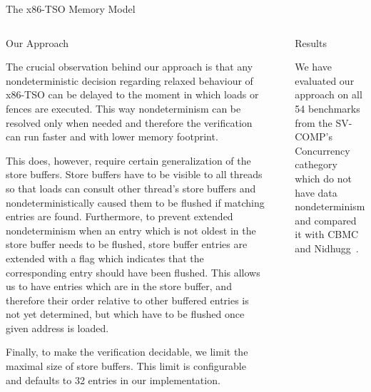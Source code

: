 \documentclass[final, 20pt, a0]{beamer}
\newlength{\sepwid}
\newlength{\onecolwid}
\newlength{\twocolwid}
\newcommand{\xtso}{x86-TSO\xspace}
\begin{document}
\begin{frame}[t]
\begin{columns}[t]
\begin{column}{\twocolwid}
\begin{block}{The \xtso Memory Model}
\end{block}

\begin{columns}[t,totalwidth=\twocolwid] %

\begin{column}{\onecolwid}

\begin{block}{Our Approach}

The crucial observation behind our approach is that any nondeterministic
decision regarding relaxed behaviour of \xtso can be delayed to the moment in
which loads or fences are executed. This way nondeterminism can be resolved
only when needed and therefore the verification can run faster and with lower
memory footprint.

This does, however, require certain generalization of the store buffers. Store
buffers have to be visible to all threads so that loads can consult other
thread's store buffers and nondeterministically caused them to be flushed if
matching entries are found. Furthermore, to prevent extended nondeterminism when
an entry which is not oldest in the store buffer needs to be flushed, store
buffer entries are extended with a flag which indicates that the corresponding
entry should have been flushed. This allows us to have entries which are in the
store buffer, and therefore their order relative to other buffered entries is
not yet determined, but which have to be flushed once given address is loaded.

Finally, to make the verification decidable, we limit the maximal size of store
buffers. This limit is configurable and defaults to 32 entries in our
implementation.

\end{block}


\end{column} %

\begin{column}{\sepwid}\end{column} %
\begin{column}{\onecolwid}

\begin{block}{Results}

We have evaluated our approach on all 54 benchmarks from the SV-COMP's
Concurrency cathegory which do not have data nondeterminism and compared it with
CBMC~\cite{Clarke2004} and Nidhugg~\cite{Abdulla2015}.

\end{block}


\end{column}
\end{columns}
\end{column}
\end{columns}
\end{frame}
\end{document}
